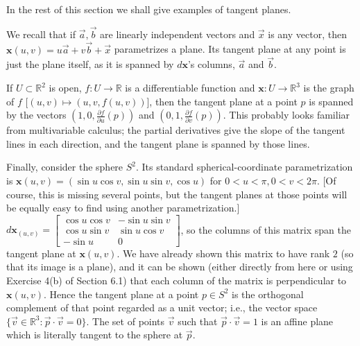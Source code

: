 \documentclass[leqno]{book}
\begin{document}
\noindent In the rest of this section we shall give examples of tangent planes.

We recall that if $\vec a,\vec b$ are linearly independent vectors and $\vec x$ is any vector, then $\mathbf x(u,v)=u\vec a+v\vec b+\vec x$ parametrizes a plane.  Its tangent plane at any point is just the plane itself, as it is spanned by $d\mathbf x$'s columns, $\vec a$ and $\vec b$.

If $U\subset\mathbb R^2$ is open, $f:U\to\mathbb R$ is a differentiable function and $\mathbf x:U\to\mathbb R^3$ is the graph of $f$ [$(u,v)\mapsto(u,v,f(u,v))$], then the tangent plane at a point $p$ is spanned by the vectors $\left(1,0,\frac{\partial f}{\partial u}(p)\right)$ and $\left(0,1,\frac{\partial f}{\partial v}(p)\right)$.  This probably looks familiar from multivariable calculus; the partial derivatives give the slope of the tangent lines in each direction, and the tangent plane is spanned by those lines.

Finally, consider the sphere $S^2$.  Its standard spherical-coordinate parametrization is $\mathbf x(u,v)=(\sin u\cos v,\sin u\sin v,\cos u)$ for $0<u<\pi,0<v<2\pi$.  [Of course, this is missing several points, but the tangent planes at those points will be equally easy to find using another parametrization.]  $d\mathbf x_{(u,v)}=\begin{bmatrix}\cos u\cos v&-\sin u\sin v\\\cos u\sin v&\sin u\cos v\\-\sin u&0\end{bmatrix}$, so the columns of this matrix span the tangent plane at $\mathbf x(u,v)$.  We have already shown this matrix to have rank $2$ (so that its image is a plane), and it can be shown (either directly from here or using Exercise 4(b) of Section 6.1) that each column of the matrix is perpendicular to $\mathbf x(u,v)$.  Hence the tangent plane at a point $p\in S^2$ is the orthogonal complement of that point regarded as a unit vector; i.e., the vector space $\{\vec v\in\mathbb R^3:\vec p\cdot\vec v=0\}$.  The set of points $\vec v$ such that $\vec p\cdot\vec v=1$ is an affine plane which is literally tangent to the sphere at $\vec p$.
\end{document}
